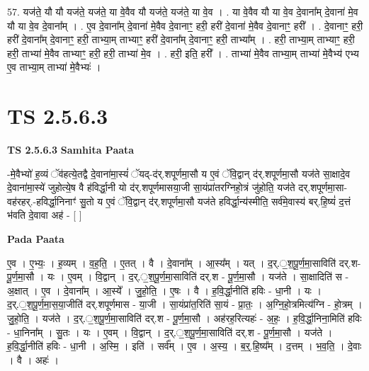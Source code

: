 \documentclass[17pt]{extarticle}
\begin{document}
57. यज॑ते॒ यौ यौ यज॑ते॒ यज॑ते॒ या वे॒वैव यौ यज॑ते॒ यज॑ते॒ या वे॒व । . या वे॒वैव यौ या वे॒व दे॒वाना᳚म् दे॒वाना॑ मे॒व यौ या वे॒व दे॒वाना᳚म् । . ए॒व दे॒वाना᳚म् दे॒वाना॑ मे॒वैव दे॒वानाꣳ॒॒ हरी॒ हरी॑ दे॒वाना॑ मे॒वैव दे॒वानाꣳ॒॒ हरी᳚ । . दे॒वानाꣳ॒॒ हरी॒ हरी॑ दे॒वाना᳚म् दे॒वानाꣳ॒॒ हरी॒ ताभ्या॒म् ताभ्याꣳ॒॒ हरी॑ दे॒वाना᳚म् दे॒वानाꣳ॒॒ हरी॒ ताभ्या᳚म् । . हरी॒ ताभ्या॒म् ताभ्याꣳ॒॒ हरी॒ हरी॒ ताभ्या॑ मे॒वैव ताभ्याꣳ॒॒ हरी॒ हरी॒ ताभ्या॑ मे॒व । . हरी॒ इति॒ हरी᳚ । . ताभ्या॑ मे॒वैव ताभ्या॒म् ताभ्या॑ मे॒वैभ्य॑ एभ्य ए॒व ताभ्या॒म् ताभ्या॑ मे॒वैभ्यः॑ । \newline
\pagebreak
{}
\section*{ TS 2.5.6.3 }

\textbf{TS 2.5.6.3 } \newline
\textbf{Samhita Paata} \newline

-मे॒वैभ्यो॑ ह॒व्यं ॅव॑हत्ये॒तद्वै दे॒वाना॑मा॒स्यं॑ ॅयद्-द॑र्.शपूर्णमा॒सौ य ए॒वं ॅवि॒द्वान् द॑र्.शपूर्णमा॒सौ यज॑ते सा॒क्षादे॒व दे॒वाना॑मा॒स्ये॑ जुहोत्ये॒ष वै ह॑विर्द्धा॒नी यो द॑र्.शपूर्णमासया॒जी सा॒यंप्रा॑तरग्निहो॒त्रं जु॑होति॒ यज॑ते दर्.शपूर्णमा॒सा-वह॑रहर्.-हविर्द्धा॒निनाꣳ॑ सु॒तो य ए॒वं ॅवि॒द्वान् द॑र्.शपूर्णमा॒सौ यज॑ते हविर्द्धा॒न्य॑स्मीति॒ सर्व॑मे॒वास्य॑ बर्.हि॒ष्यं॑ द॒त्तं भ॑वति दे॒वावा अह॑ - [  ] \newline

\textbf{Pada Paata} \newline

ए॒व । ए॒भ्यः॒ । ह॒व्यम् । व॒ह॒ति॒ । ए॒तत् । वै । दे॒वाना᳚म् । आ॒स्य᳚म् । यत् । द॒र्.॒श॒पू॒र्ण॒मा॒साविति॑ दर्.श-पू॒र्ण॒मा॒सौ । यः । ए॒वम् । वि॒द्वान् । द॒र्.॒श॒पू॒र्ण॒मा॒साविति॑ दर्.श - पू॒र्ण॒मा॒सौ । यज॑ते । सा॒क्षादिति॑ स - अ॒क्षात् । ए॒व । दे॒वाना᳚म् । आ॒स्ये᳚ । जु॒हो॒ति॒ । ए॒षः । वै । ह॒वि॒र्द्धा॒नीति॑ हविः - धा॒नी । यः । द॒र्.॒श॒पू॒र्ण॒मा॒स॒या॒जीति॑ दर्.शपूर्णमास - या॒जी । सा॒यंप्रा॑त॒रिति॑ सा॒यं - प्रा॒तः॒ । अ॒ग्नि॒हो॒त्रमित्य॑ग्नि - हो॒त्रम् । जु॒हो॒ति॒ । यज॑ते । द॒र्.॒श॒पू॒र्ण॒मा॒साविति॑ दर्.श - पू॒र्ण॒मा॒सौ । अह॑रह॒रित्यहः॑ - अ॒हः॒ । ह॒वि॒र्द्धा॒निना॒मिति॑ हविः - धा॒निना᳚म् । सु॒तः । यः । ए॒वम् । वि॒द्वान् । द॒र्.॒श॒पू॒र्ण॒मा॒साविति॑ दर्.श - पू॒र्ण॒मा॒सौ । यज॑ते । ह॒वि॒र्द्धा॒नीति॑ हविः - धा॒नी । अ॒स्मि॒ । इति॑ । सर्व᳚म् । ए॒व । अ॒स्य॒ । ब॒र्॒.हि॒ष्य᳚म् । द॒त्तम् । भ॒व॒ति॒ । दे॒वाः । वै । अहः॑ ।  \newline
\end{document}
